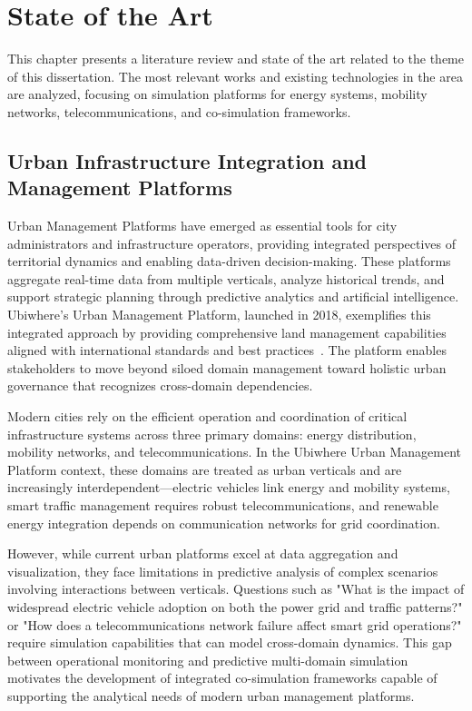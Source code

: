 \chapter{State of the Art}%
\label{chapter:stateoftheart}

\begin{introduction}
This chapter presents a literature review and state of the art related to the theme of this dissertation. The most relevant works and existing technologies in the area are analyzed, focusing on simulation platforms for energy systems, mobility networks, telecommunications, and co-simulation frameworks.
\end{introduction}


\section{Urban Infrastructure Integration and Management Platforms}

Urban Management Platforms have emerged as essential tools for city administrators and infrastructure operators, providing integrated perspectives of territorial dynamics and enabling data-driven decision-making. These platforms aggregate real-time data from multiple verticals, analyze historical trends, and support strategic planning through predictive analytics and artificial intelligence. Ubiwhere's Urban Management Platform, launched in 2018, exemplifies this integrated approach by providing comprehensive land management capabilities aligned with international standards and best practices~\cite{ubiwhere_urban_platform}. The platform enables stakeholders to move beyond siloed domain management toward holistic urban governance that recognizes cross-domain dependencies.

Modern cities rely on the efficient operation and coordination of critical infrastructure systems across three primary domains: energy distribution, mobility networks, and telecommunications. In the Ubiwhere Urban Management Platform context, these domains are treated as urban verticals and are increasingly interdependent—electric vehicles link energy and mobility systems, smart traffic management requires robust telecommunications, and renewable energy integration depends on communication networks for grid coordination.

However, while current urban platforms excel at data aggregation and visualization, they face limitations in predictive analysis of complex scenarios involving interactions between verticals. Questions such as "What is the impact of widespread electric vehicle adoption on both the power grid and traffic patterns?" or "How does a telecommunications network failure affect smart grid operations?" require simulation capabilities that can model cross-domain dynamics. This gap between operational monitoring and predictive multi-domain simulation motivates the development of integrated co-simulation frameworks capable of supporting the analytical needs of modern urban management platforms.

